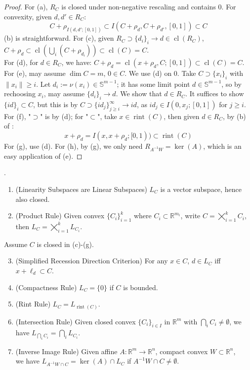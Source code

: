 \begin{proof}
	For (a), $R_C$ is closed under non-negative rescaling and contains $0$. For convexity, given $d,d'\in R_C$:
	\[
		C+\rho_{I(d,d';[0,1])}\subset I\left(C+\rho_{d},C+\rho_{d'},[0,1]\right)\subset C
	\]
	(b) is straightforward. For (c), given $R_C\supset \{d_i\}_i\to d\in \operatorname{cl}(R_C)$, $C+\rho_d\subset \operatorname{cl}\left(\bigcup_i\left(C+\rho_{d_i}\right)\right)\subset \operatorname{cl}(C)=C$.\\
	For (d), for $d\in R_C$, we have: $C+\rho_d=\operatorname{cl}\left(x+\rho_d,C;[0,1]\right)\subset \operatorname{cl}(C)=C$.\\
	For (e), may assume $\dim C=m$, $0\in C$. We use (d) on $0$. Take $C\supset \{x_i\}_i$ with $\|x_i\|\geq i$. Let $d_i:=\nu(x_i)\in \mathbb{S}^{m-1}$; it has some limit point $d\in \mathbb{S}^{m-1}$, so by rechoosing $x_i$, may assume $\{d_i\}_i\to d$. We show that $d\in R_C$. It suffices to show $\{id\}_i\subset C$, but this is by $C\supset\{id_j\}_{j\geq i}^\infty\to id$, as $id_j\in I(0,x_j;[0,1])$ for $j\geq i$.\\
	For (f), "$\supset$" is by (d); for "$\subset$", take $x\in \operatorname{rint}(C)$, then given $d\in R_C$, by (b) of :
	\[
		x+\rho_d = I(x,x+\rho_d;[0, 1))\subset \operatorname{rint}(C)
	\]
	For (g), use (d). For (h), by (g), we only need $R_{A^{-1}W}=\operatorname{ker}(A)$, which is an easy application of (e).
\end{proof}

\begin{prop}.
	\label{prop:013-yoga-linearity}
	\begin{enumerate}[label=(\alph*)]
		\item (Linearity Subspaces are Linear Subspaces) $L_C$ is a vector subspace, hence also closed.
		\item (Product Rule) Given convex $\{C_i\}_{i=1}^k$ where $C_i\subset \mathbb{R}^{m_i}$, write $C=\bigtimes_{i=1}^kC_i$, then $L_C=\bigtimes_{i=1}^kL_{C_i}$.
	\end{enumerate}
	Assume $C$ is closed in (c)-(g).
	\begin{enumerate}[label=(\alph*)]
		\setcounter{enumi}{2}
		\item (Simplified Recession Direction Criterion) For any $x\in C$, $d\in L_C$ iff $x+\ell_d\subset C$.
		\item (Compactness Rule) $L_C=\{0\}$ if $C$ is bounded.
		\item (Rint Rule) $L_C=L_{\operatorname{rint}(C)}$.
		\item (Intersection Rule) Given closed convex $\{C_i\}_{i\in I}$ in $\mathbb{R}^m$ with $\bigcap_i{C_i}\neq\emptyset$, we have $L_{\bigcap_iC_i}=\bigcap_iL_{C_i}$.
		\item (Inverse Image Rule) Given affine $A:\mathbb{R}^m\to \mathbb{R}^n$, compact convex $W\subset \mathbb{R}^n$,\\we have $L_{A^{-1}W\cap C}=\operatorname{ker}(A)\cap L_C$ if $A^{-1}W\cap C\neq\emptyset$.
	\end{enumerate}
\end{prop}

